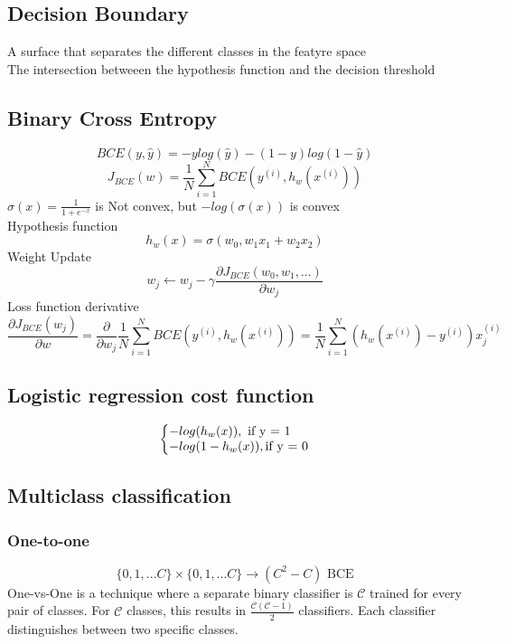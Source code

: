 \documentclass{article}
\makeatletter
\newenvironment{system}%
{\left\lbrace\begin{array}{@{}l@{}}}%
{\end{array}\right.}
\makeatother
\begin{document}
\subsection*{Decision Boundary}
A surface that separates the different classes in the featyre space \\
The intersection betweeen the hypothesis function and the decision threshold \\

\subsection*{Binary Cross Entropy}
\[BCE(y, \hat{y}) = -ylog(\hat{y}) - (1 - y)log(1 - \hat{y})\]
\[J_{BCE}(w) = \frac{1}{N} \sum_{i=1}^{N} BCE(y^{(i)}, h_w(x^{(i)}))\]
$\sigma(x) = \frac{1}{1 + e^{-x}}$ is Not convex, but
$-log(\sigma(x))$ is convex\\
Hypothesis function
\[h_w(x) = \sigma(w_0, w_1 x_1 + w_2 x_2) \]
Weight Update
\[w_j \leftarrow w_j - \gamma \frac{\partial J_{BCE}(w_0, w_1, \dots)}{\partial w_j}\]
Loss function derivative
\[\frac{\partial J_{BCE}(w_j)}{\partial w} = \frac{\partial}{\partial w_j} \frac{1}{N} \sum_{i=1}^{N} BCE(y^{(i)}, h_w(x^{(i)})) = \frac{1}{N} \sum_{i=1}^{N} (h_w(x^{(i)}) - y^{(i)})x_j^{(i)}\]
\subsection{Logistic regression cost function}
\begin{equation}
    \begin{system}
    -log(h_w(x)), \text{ if y = 1}\\
    -log(1 - h_w(x)), \text{if y = 0}
    \end{system}
    \end{equation}


\subsection*{Multiclass classification}
\subsubsection*{One-to-one}
\[\{0, 1, ... C\} \times \{0, 1, ... C\} \rightarrow (C^2 - C) \text{ BCE}\]
One-vs-One is a technique where a separate binary classifier is $\mathcal{C}$ trained for every pair of classes. For $\mathcal{C}$ classes, this results in $\frac{\mathcal{C}(\mathcal{C} - 1)}{2}$ classifiers. Each classifier distinguishes between two specific classes.
\end{document}
